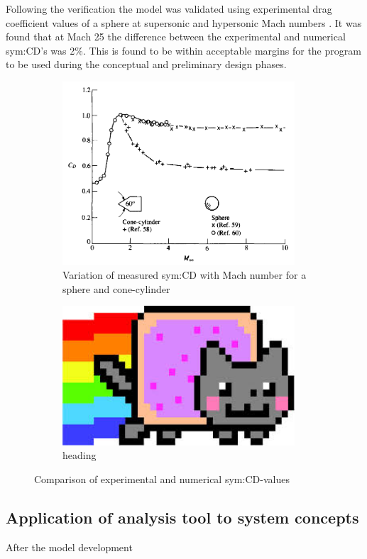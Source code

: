 Following the verification the model was validated using experimental drag coefficient values of a sphere at supersonic and hypersonic Mach numbers \cite[p. 783]{AndersonJr.2007}. It was found that at Mach 25 the difference between the experimental and numerical \gls{sym:CD}'s was 2\%. This is found to be within acceptable margins for the program to be used during the conceptual and preliminary design phases.

\begin{figure}[h]
	\centering
	\begin{subfigure}[b]{0.49\textwidth}
		\centering
		\includegraphics[width=0.95\textwidth]{./Figure/CD_sphere_exp}
		\caption[Variation of measured \gls{sym:CD} with Mach number for a sphere and cone-cylinder]{Variation of measured \gls{sym:CD} with Mach number for a sphere and cone-cylinder \cite{AndersonJr.2007,Cox1965}}
		\label{fig:exp_cd}
	\end{subfigure}
	\begin{subfigure}[b]{0.49\textwidth}
		\centering
		\includegraphics[width=0.95\textwidth]{./Figure/Nyan}
		\caption{heading}
		\label{fig:num_cd}
	\end{subfigure}
	\caption{Comparison of experimental and numerical \gls{sym:CD}-values}
	\label{fig:comparison_cd}
\end{figure}

\subsection{Application of analysis tool to system concepts}
\label{subsec:appaeroanal}
After the model development 